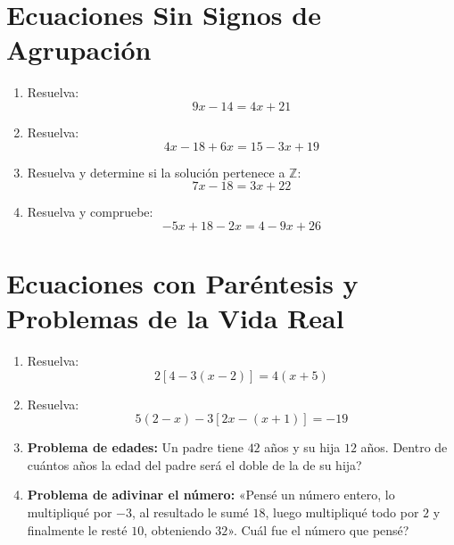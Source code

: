 \documentclass[12pt, letterpaper]{article}
\newcommand{\Z}{\mathbb{Z}}
\begin{document}
\newpage

\section{Ecuaciones Sin Signos de Agrupación}

\begin{enumerate}[leftmargin=*]
  \item Resuelva:
        \[
          9x - 14 = 4x + 21
        \]

  \item Resuelva:
        \[
          4x - 18 + 6x = 15 - 3x + 19
        \]

  \item Resuelva y determine si la solución pertenece a $\Z$:
        \[
          7x - 18 = 3x + 22
        \]

  \item Resuelva y compruebe:
        \[
          -5x + 18 - 2x = 4 - 9x + 26
        \]
\end{enumerate}

\newpage

\section{Ecuaciones con Paréntesis y Problemas de la Vida Real}

\begin{enumerate}[leftmargin=*]
  \item Resuelva:
        \[
          2[4 - 3(x - 2)] = 4(x + 5)
        \]

  \item Resuelva:
        \[
          5(2 - x) - 3[2x - (x + 1)] = -19
        \]

  \item \textbf{Problema de edades:} Un padre tiene $42$ años y su hija $12$ años. \textquestiondown Dentro de cuántos años la edad del padre será el doble de la de su hija?

  \item \textbf{Problema de adivinar el número:} «Pensé un número entero, lo multipliqué por $-3$, al resultado le sumé $18$, luego multipliqué todo por $2$ y finalmente le resté $10$, obteniendo $32$». \textquestiondown Cuál fue el número que pensé?
\end{enumerate}
\end{document}
